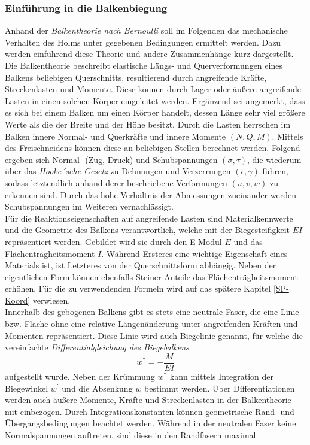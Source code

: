 \subsubsection{Einführung in die Balkenbiegung}
Anhand der \textit{Balkentheorie nach Bernoulli} soll im Folgenden das mechanische Verhalten des Holms unter gegebenen Bedingungen ermittelt werden. Dazu werden einführend diese Theorie und andere Zusammenhänge kurz dargestellt.\\

\noindent Die Balkentheorie beschreibt elastische Längs- und Querverformungen eines Balkens beliebigen Querschnitts, resultierend durch angreifende Kräfte, Streckenlasten und Momente. Diese können durch Lager oder äußere angreifende Lasten in einen solchen Körper eingeleitet werden. Ergänzend sei angemerkt, dass es sich bei einem Balken um einen Körper handelt, dessen Länge sehr viel größere Werte als die der Breite und der Höhe besitzt. Durch die Lasten herrschen im Balken innere Normal- und Querkräfte und innere Momente $(N, Q, M)$. Mittels des Freischneidens können diese an beliebigen Stellen berechnet werden. Folgend ergeben sich Normal- (Zug, Druck) und Schubspannungen $(\sigma, \tau)$, die wiederum über das \textit{Hooke´sche Gesetz} zu Dehnungen und Verzerrungen $(\epsilon, \gamma)$ führen, sodass letztendlich anhand derer beschriebene Verformungen $(u, v, w)$ zu erkennen sind. Durch das hohe Verhältnis der Abmessungen zueinander werden Schubspannungen im Weiteren vernachlässigt. \\

\noindent Für die Reaktionseigenschaften auf angreifende Lasten sind Materialkennwerte und die Geometrie des Balkens verantwortlich, welche mit der Biegesteifigkeit $EI$ repräsentiert werden. Gebildet wird sie durch den E-Modul $E$ und das Flächenträgheitsmoment $I$. Während Ersteres eine wichtige Eigenschaft eines Materials ist, ist Letzteres von der Querschnittsform abhängig. Neben der eigentlichen Form können ebenfalls Steiner-Anteile das Flächenträgheitsmoment erhöhen. Für die zu verwendenden Formeln wird auf das spätere Kapitel \ref{SP-Koord} verwiesen.\\


\noindent Innerhalb des gebogenen Balkens gibt es stets eine neutrale Faser, die eine Linie bzw. Fläche ohne eine relative Längenänderung unter angreifenden Kräften und Momenten repräsentiert. Diese Linie wird auch Biegelinie genannt, für welche die vereinfachte \textit{Differentialgleichung des Biegebalkens}
\begin{equation}
	w^{''}=-\frac{M}{EI}
\end{equation}
aufgestellt wurde. Neben der Krümmung $w^{''}$ kann mittels Integration der Biegewinkel $w^{'}$ und die Absenkung $w$ bestimmt werden. Über Differentiationen werden auch äußere Momente, Kräfte und Streckenlasten in der Balkentheorie mit einbezogen. Durch Integrationskonstanten können geometrische Rand- und Übergangsbedingungen beachtet werden. Während in der neutralen Faser keine Normalspannungen auftreten, sind diese in den Randfasern maximal.\\

